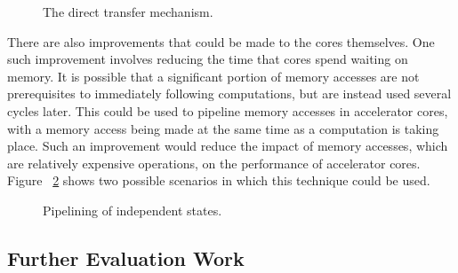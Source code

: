 \documentclass{UoYCSproject}
\begin{document}
\begin{figure}[H]
\caption{The direct transfer mechanism.}
\label{fig:directTransfer}
\end{figure}

There are also improvements that could be made to the cores themselves. One such improvement involves reducing the time
that cores spend waiting on memory. It is possible that a significant portion of memory accesses are not prerequisites to
immediately following computations, but are instead used several cycles later. This could be used to pipeline memory accesses
in accelerator cores, with a memory access being made at the same time as a computation is taking place. Such an improvement
would reduce the impact of memory accesses, which are relatively expensive operations, on the performance of accelerator cores.
Figure ~\ref{fig:pipeliningAccelerators} shows two possible scenarios in which this technique could be used.

\begin{figure}[H]
\caption{Pipelining of independent states.}
\label{fig:pipeliningAccelerators}
\end{figure}

\subsection{Further Evaluation Work}
\end{document}

